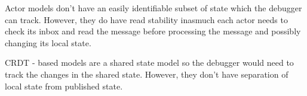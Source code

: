 Actor models don't have an easily identifiable subset of state which the debugger can track. However, they do have read stability inasmuch each actor needs to check its inbox and read the message before processing the message and possibly changing its local state.

CRDT - based models are a shared state model so the debugger would need to track the changes in the shared state. However, they don't have separation of local state from published state.



































